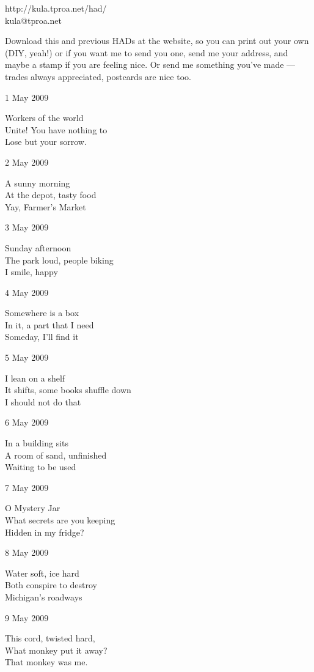 \documentclass[12pt]{article}
\begin{document}
http://kula.tproa.net/had/ \\
kula@tproa.net

Download this and previous HADs at the website, so you can
print out your own (DIY, yeah!) or if you want me to send
you one, send me your address, and maybe a stamp if you
are feeling nice. Or send me something you've made ---
trades always appreciated, postcards are nice too.


1 May 2009

Workers of the world \\
Unite! You have nothing to \\
Lose but your sorrow.

2 May 2009

A sunny morning \\
At the depot, tasty food \\
Yay, Farmer's Market

3 May 2009

Sunday afternoon \\
The park loud, people biking \\
I smile, happy

\newpage

4 May 2009

Somewhere is a box \\
In it, a part that I need \\
Someday, I'll find it

5 May 2009

I lean on a shelf \\
It shifts, some books shuffle down \\
I should not do that

6 May 2009

In a building sits \\
A room of sand, unfinished \\
Waiting to be used

7 May 2009

O Mystery Jar \\
What secrets are you keeping \\
Hidden in my fridge?

8 May 2009

Water soft, ice hard \\
Both conspire to destroy \\
Michigan's roadways

9 May 2009

This cord, twisted hard, \\
What monkey put it away? \\
That monkey was me.
\end{document}
